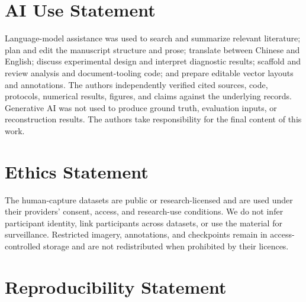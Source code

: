 \section*{AI Use Statement}

Language-model assistance was used to search and summarize relevant
literature; plan and edit the manuscript structure and prose; translate
between Chinese and English; discuss experimental design and interpret
diagnostic results; scaffold and review analysis and document-tooling code;
and prepare editable vector layouts and annotations. The authors independently
verified cited sources, code, protocols, numerical results, figures, and
claims against the underlying records. Generative AI was not used to produce
ground truth, evaluation inputs, or reconstruction results. The authors take
responsibility for the final content of this work.

\section*{Ethics Statement}

The human-capture datasets are public or research-licensed and are used under
their providers' consent, access, and research-use conditions. We do not infer
participant identity, link participants across datasets, or use the material
for surveillance. Restricted imagery, annotations, and checkpoints remain in
access-controlled storage and are not redistributed when prohibited by their
licences.

\section*{Reproducibility Statement}

